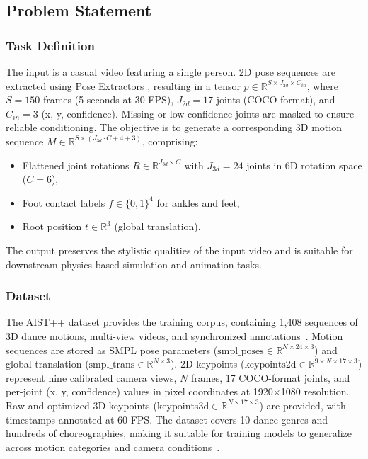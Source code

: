 \subsection{Problem Statement}
\label{sec:statement}

\subsubsection{Task Definition}
The input is a casual video featuring a single person. 2D pose sequences are extracted using Pose Extractors \cite{openpose2020,alphapose2022}, resulting in a tensor $p \in \mathbb{R}^{S \times J_{2d} \times C_{in}}$, where $S = 150$ frames (5 seconds at 30 FPS), $J_{2d} = 17$ joints (COCO format), and $C_{in} = 3$ (x, y, confidence). Missing or low-confidence joints are masked to ensure reliable conditioning. The objective is to generate a corresponding 3D motion sequence $M \in \mathbb{R}^{S \times (J_{3d} \cdot C + 4 + 3)}$, comprising:
\begin{itemize}
    \item Flattened joint rotations $R \in \mathbb{R}^{J_{3d} \times C}$ with $J_{3d} = 24$ joints in 6D rotation space ($C = 6$),
    \item Foot contact labels $f \in \{0,1\}^4$ for ankles and feet,
    \item Root position $t \in \mathbb{R}^3$ (global translation).
\end{itemize}
The output preserves the stylistic qualities of the input video and is suitable for downstream physics-based simulation and animation tasks.

\subsubsection{Dataset}
The AIST++ dataset provides the training corpus, containing 1,408 sequences of 3D dance motions, multi-view videos, and synchronized annotations~\cite{aist2021}. Motion sequences are stored as SMPL pose parameters ($\text{smpl\_poses} \in \mathbb{R}^{N \times 24 \times 3}$) and global translation ($\text{smpl\_trans} \in \mathbb{R}^{N \times 3}$). 2D keypoints ($\text{keypoints2d} \in \mathbb{R}^{9 \times N \times 17 \times 3}$) represent nine calibrated camera views, $N$ frames, 17 COCO-format joints, and per-joint (x, y, confidence) values in pixel coordinates at 1920×1080 resolution. Raw and optimized 3D keypoints ($\text{keypoints3d} \in \mathbb{R}^{N \times 17 \times 3}$) are provided, with timestamps annotated at 60 FPS. The dataset covers 10 dance genres and hundreds of choreographies, making it suitable for training models to generalize across motion categories and camera conditions~\cite{aist2021}.

